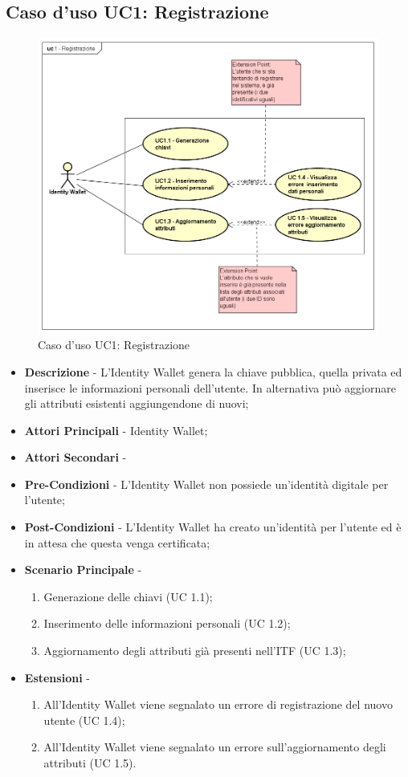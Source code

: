 \subsection{Caso d'uso UC1: Registrazione}
\begin{figure}[!h]
	\centering
	\includegraphics[scale=0.35]{immagini/usecase/UC1_Registrazione}
	\caption{Caso d'uso UC1: Registrazione}
\end{figure}
\begin{itemize}
	\item \textbf{Descrizione} - L'Identity Wallet genera la chiave pubblica, quella privata ed inserisce le informazioni personali dell'utente. In alternativa può aggiornare gli attributi esistenti aggiungendone di nuovi;
	\item \textbf{Attori Principali} - Identity Wallet;
	\item \textbf{Attori Secondari} -
	\item \textbf{Pre-Condizioni} - L'Identity Wallet non possiede un'identità digitale per l'utente;
	\item \textbf{Post-Condizioni} - L'Identity Wallet ha creato un'identità per l'utente ed è in attesa che questa venga certificata;
	\item \textbf{Scenario Principale} - 
	\begin{enumerate}
		\item Generazione delle chiavi (UC 1.1);
		\item Inserimento delle informazioni personali (UC 1.2);
		\item Aggiornamento degli attributi già presenti nell'\gls{ITF} (UC 1.3);
	\end{enumerate}
	\item \textbf{Estensioni} -
	\begin{enumerate}
		\item All'Identity Wallet viene segnalato un errore di registrazione del nuovo utente (UC 1.4);
		\item All'Identity Wallet viene segnalato un errore sull'aggiornamento degli attributi (UC 1.5).
	\end{enumerate}
\end{itemize}
\newpage
